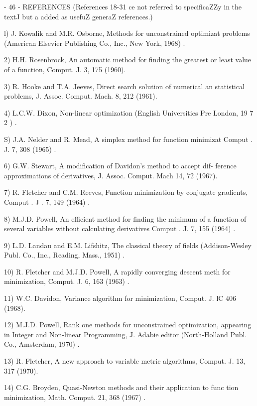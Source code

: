                           - 46 -
                              REFERENCES
(References 18-31 ce not referred to specificaZZy in the textJ but a
added as usefuZ generaZ references.)
 
 
 l)  J. Kowalik and M.R. Osborne, Methods for unconstrained optimizat
        problems (American Elsevier Publishing Co., Inc., New York,
        1968) .
 
 2) H.H. Rosenbrock, An automatic method for finding the greatest or
        least value of a function, Comput. J. 3, 175 (1960).
 
 3)  R. Hooke and T.A. Jeeves, Direct search solution of numerical an
        statistical problems, J. Assoc. Comput. Mach. 8, 212 (1961).
 
 4)  L.C.W. Dixon, Non-linear optimization  (English Universities Pre
        London, 19 7 2 ) .
 
 S)  J.A. Nelder and R. Mead, A simplex method for function minimizat
        Comput . J. 7, 308 (1965) .
 
 6) G.W. Stewart, A modification of Davidon's method to accept dif-
        ference approximations of derivatives, J. Assoc. Comput. Mach
        14, 72 (1967).
 
 7)  R. Fletcher and C.M. Reeves, Function minimization by conjugate
        gradients, Comput . J . 7, 149 (1964) .
 
 8) M.J.D. Powell, An efficient method for finding the minimum of a
        function of several variables without calculating derivatives
        Comput . J. 7, 155 (1964) .
 
 9) L.D. Landau and E.M. Lifshitz, The classical theory of fields
        (Addison-Wesley Publ. Co., Inc., Reading, Mass., 1951) .
 
10)  R. Fletcher and M.J.D. Powell, A rapidly converging descent meth
        for minimization, Comput. J. 6, 163 (1963) .
 
11)  W.C. Davidon, Variance algorithm for minimization, Comput. J. lC
        406 (1968).
 
12) M.J.D. Powell, Rank one methods for unconstrained optimization,
        appearing in Integer and Non-linear Programming, J. Adabie
        editor (North-Holland Publ. Co., Amsterdam, 1970) .
 
13) R. Fletcher, A new approach to variable metric algorithms,
        Comput. J. 13, 317 (1970).
 
14) C.G. Broyden, Quasi-Newton methods and their application to func
        tion minimization, Math. Comput. 21, 368 (1967) .
 
